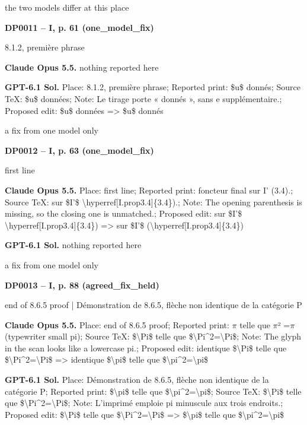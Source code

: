 the two models differ at this place\par
\par\noindent\hypertarget{DP0011}{}\textbf{DP0011 -- I, p. 61 (one\_model\_fix)}\par
8.1.2, première phrase\par
\textbf{Claude Opus 5.5.} nothing reported here\par
\textbf{GPT-6.1 Sol.} Place: 8.1.2, première phrase; Reported print: \$u\$ donnés; Source TeX: \$u\$ données; Note: Le tirage porte « donnés », sans e supplémentaire.; Proposed edit: \$u\$ données =\allowbreak > \$u\$ donnés\par
a fix from one model only\par
\par\noindent\hypertarget{DP0012}{}\textbf{DP0012 -- I, p. 63 (one\_model\_fix)}\par
first line\par
\textbf{Claude Opus 5.5.} Place: first line; Reported print: foncteur final sur I' (3.4).; Source TeX: sur \$I'\$ \textbackslash{}hyperref[I.prop3.4]\{3.4\}).; Note: The opening parenthesis is missing, so the closing one is unmatched.; Proposed edit: sur \$I'\$ \textbackslash{}hyperref[I.prop3.4]\{3.4\}) =\allowbreak > sur \$I'\$ (\textbackslash{}hyperref[I.prop3.4]\{3.4\})\par
\textbf{GPT-6.1 Sol.} nothing reported here\par
a fix from one model only\par
\par\noindent\hypertarget{DP0013}{}\textbf{DP0013 -- I, p. 88 (agreed\_fix\_held)}\par
end of 8.6.5 proof | Démonstration de 8.6.5, flèche non identique de la catégorie P\par
\textbf{Claude Opus 5.5.} Place: end of 8.6.5 proof; Reported print: \ensuremath{\pi} telle que \ensuremath{\pi}² =\allowbreak  \ensuremath{\pi} (typewriter small pi); Source TeX: \$\textbackslash{}Pi\$ telle que \$\textbackslash{}Pi\textasciicircum{}2=\allowbreak \textbackslash{}Pi\$; Note: The glyph in the scan looks like a lowercase pi.; Proposed edit: identique \$\textbackslash{}Pi\$ telle que \$\textbackslash{}Pi\textasciicircum{}2=\allowbreak \textbackslash{}Pi\$ =\allowbreak > identique \$\textbackslash{}pi\$ telle que \$\textbackslash{}pi\textasciicircum{}2=\allowbreak \textbackslash{}pi\$\par
\textbf{GPT-6.1 Sol.} Place: Démonstration de 8.6.5, flèche non identique de la catégorie P; Reported print: \$\textbackslash{}pi\$ telle que \$\textbackslash{}pi\textasciicircum{}2=\allowbreak \textbackslash{}pi\$; Source TeX: \$\textbackslash{}Pi\$ telle que \$\textbackslash{}Pi\textasciicircum{}2=\allowbreak \textbackslash{}Pi\$; Note: L'imprimé emploie pi minuscule aux trois endroits.; Proposed edit: \$\textbackslash{}Pi\$ telle que \$\textbackslash{}Pi\textasciicircum{}2=\allowbreak \textbackslash{}Pi\$ =\allowbreak > \$\textbackslash{}pi\$ telle que \$\textbackslash{}pi\textasciicircum{}2=\allowbreak \textbackslash{}pi\$\par
